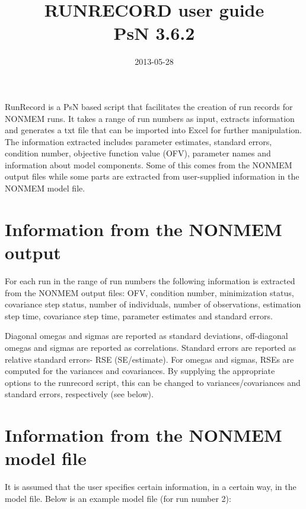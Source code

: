 \documentclass[a4paper,12pt]{article}
\title{RUNRECORD user guide\\ \vspace{2 mm} {\large PsN 3.6.2}}
\date{2013-05-28}
\begin{document}
\maketitle


RunRecord is a PsN based script that facilitates the creation of run records for NONMEM runs. It takes a range of run numbers as input, extracts information and generates a txt file that can be imported into Excel for further manipulation. The information extracted includes parameter estimates, standard errors, condition number, objective function value (OFV), parameter names and information about model components. Some of this comes from the NONMEM output files while some parts are extracted from user-supplied information in the NONMEM model file.

\section{Information from the NONMEM output}
For each run in the range of run numbers the following information is extracted from the NONMEM output files: OFV, condition number, minimization status, covariance step status, number of individuals, number of observations, estimation step time, covariance step time, parameter estimates and standard errors. 

Diagonal omegas and sigmas are reported as standard deviations, off-diagonal omegas and sigmas are reported as correlations. Standard errors are reported as relative standard errors- RSE (SE/estimate). For omegas and sigmas, RSEs are computed for the variances and covariances. By supplying the appropriate options to the runrecord script, this can be changed to variances/covariances and standard errors, respectively (see below).

\section{Information from the NONMEM model file}
It is assumed that the user specifies certain information, in a certain way, in the model file. Below is an example model file (for run number 2):
\end{document}
